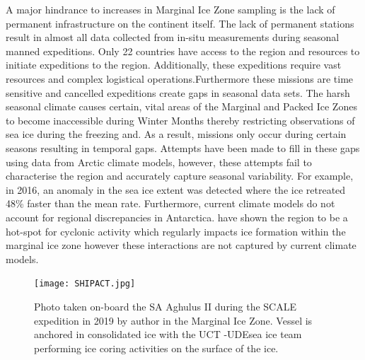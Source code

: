 A major hindrance to increases in Marginal Ice Zone sampling is the lack of permanent infrastructure on the continent itself. The lack of permanent stations result in almost all data collected from in-situ measurements during seasonal manned expeditions. Only 22 countries have access to the region and resources to initiate expeditions to the region. Additionally, these expeditions require vast resources and complex logistical operations.Furthermore these missions are time sensitive and cancelled expeditions create gaps in seasonal data sets. The harsh seasonal climate causes certain, vital areas of the Marginal and Packed Ice Zones to become inaccessible during Winter Months thereby restricting observations of sea ice during the freezing and. As a result, missions only occur during certain seasons resulting in temporal gaps. Attempts have been made to fill in these gaps using data from Arctic climate models, however, these attempts fail to characterise the region and accurately capture seasonal variability. For example, in 2016, an anomaly in the sea ice extent was detected where the ice retreated 48\% faster than the mean rate\cite{turner2017unprecedented}. Furthermore, current climate models do not account for regional discrepancies in Antarctica. \textcite{vichi2019effects} have shown the region to be a hot-spot for cyclonic activity which regularly impacts ice formation within the marginal ice zone however these interactions are not captured by current climate models\cite{vichi2019effects}.\par

\begin{figure}[H]
    \centering
    \texttt{[image: SHIPACT.jpg]}
    \caption{Photo taken on-board the SA Aghulus II during the SCALE expedition in 2019 by author in  the Marginal Ice Zone. Vessel is anchored in consolidated ice with the UCT \protect\footnotemark -UDE\protect\footnotemark sea ice team performing ice coring activities on the surface of the ice.}
    \label{fig:cruise}
\end{figure}

